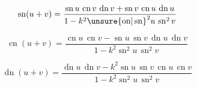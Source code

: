 \[
\operatorname{sn}(u+v)=\frac{\operatorname{sn} u\,\operatorname{cn} v\,\operatorname{dn} v+\operatorname{sn} v\,\operatorname{cn} u\,\operatorname{dn} u}{1-k^2{\unsure{\mathrm{on}|\operatorname{sn}}}^2u\,\operatorname{sn}^2v}
\]

\[
\operatorname{cn}(u+v)=\frac{\operatorname{cn} u\,\operatorname{cn} v-\operatorname{sn} u\,\operatorname{sn} v\,\operatorname{dn} u\,\operatorname{dn} v}{1-k^2\operatorname{sn}^2u\,\operatorname{sn}^2v}
\]

\[
\operatorname{dn}(u+v)=\frac{\operatorname{dn} u\,\operatorname{dn} v-k^2\operatorname{sn} u\,\operatorname{sn} v\,\operatorname{cn} u\,\operatorname{cn} v}{1-k^2\operatorname{sn}^2u\,\operatorname{sn}^2v}
\]

